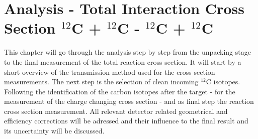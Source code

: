 \section{Analysis - Total Interaction Cross Section $^{12}$C + $^{12}$C - $^{12}$C + $^{12}$C}
This chapter will go through the  analysis step by step from the unpacking stage to the final measurement of the total reaction cross section. It will start by a short overview of the transmission method used for the cross section measurements. The next step is  the selection of clean incoming $^{12}$C isotopes. Following the identification of the carbon isotopes after the target - for the measurement of the charge changing cross section - and as final step the reaction cross section measurement. \newline
All relevant detector related geometrical and efficiency corrections will be adressed and their influence to the final result and its uncertainty will be discussed.
